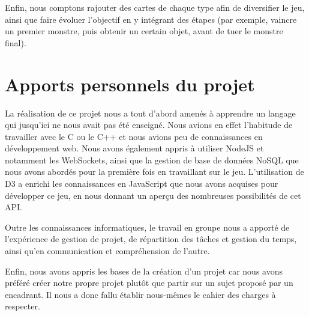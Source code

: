 \documentclass[12pt]{report}
\begin{document}
  Enfin, nous comptons rajouter des cartes de chaque type afin de diversifier le jeu, ainsi que faire évoluer l'objectif en y intégrant des étapes (par exemple, vaincre un premier monstre, puis obtenir un certain objet, avant de tuer le monstre final).

  \section*{Apports personnels du projet}
  La réalisation de ce projet nous a tout d'abord amenés à apprendre un langage qui jusqu'ici ne nous avait pas été enseigné. Nous avions en effet l'habitude de travailler avec le C ou le C++ et nous avions peu de connaissances en développement web. Nous avons également appris à utiliser NodeJS et notamment les WebSockets, ainsi que la gestion de base de données NoSQL que nous avons abordés pour la première fois en travaillant sur le jeu. L'utilisation de D3 a enrichi les connaissances en JavaScript que nous avons acquises pour développer ce jeu, en nous donnant un aperçu des nombreuses possibilités de cet API.

  Outre les connaissances informatiques, le travail en groupe nous a apporté de l'expérience de gestion de projet, de répartition des tâches et gestion du temps, ainsi qu'en communication et compréhension de l'autre.

  Enfin, nous avons appris les bases de la création d'un projet car nous avons préféré créer notre propre projet plutôt que partir sur un sujet proposé par un encadrant. Il nous a donc fallu établir nous-mêmes le cahier des charges à respecter.
\end{document}
